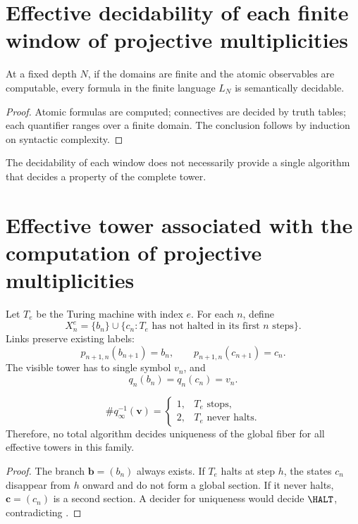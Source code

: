\label{chap:p3-83-46-godel_turing}

\section{Effective decidability of each finite window of projective multiplicities}

\begin{proposition}
At a fixed depth \(N\), if the domains are finite and the atomic
observables are computable, every formula in the finite language
\(L_N\) is semantically decidable.
\end{proposition}

\begin{proof}
Atomic formulas are computed; connectives are decided by truth
tables; each quantifier ranges over a finite domain. The conclusion follows by
induction on syntactic complexity.
\end{proof}

The decidability of each window does not necessarily provide a single
algorithm that decides a property of the complete tower.

\section{Effective tower associated with the computation of projective multiplicities}

Let \(T_e\) be the Turing machine with index \(e\). For each \(n\), define
\[
 X_n^e
 =
 \{b_n\}
 \cup
 \{c_n:T_e\text{ has not halted in its first }n\text{ steps}\}.
\]
Links preserve existing labels:
\[
  p_{n+1,n}(b_{n+1})=b_n,
  \qquad
  p_{n+1,n}(c_{n+1})=c_n.
\]
The visible tower has to single symbol \(v_n\), and
\[
  q_n(b_n)=q_n(c_n)=v_n.
\]

\begin{theorem}
\label{p3-83-c46-s1:thm:halt-fibre}
\[
 \#q_\infty^{-1}(\boldsymbol v)
 =
 \begin{cases}
 1,&T_e\text{ stops},\\
 2,&T_e\text{ never halts}.
 \end{cases}
\]
Therefore, no total algorithm decides uniqueness of the global fiber for
all effective towers in this family.
\end{theorem}

\begin{proof}
The branch \(\boldsymbol b=(b_n)\) always exists. If \(T_e\) halts at
step \(h\), the states \(c_n\) disappear from \(h\) onward and do not form a
global section. If it never halts, \(\boldsymbol c=(c_n)\) is a second
section. A decider for uniqueness would decide \(\HALT\), contradicting
\citep{turing1936}.
\end{proof}


